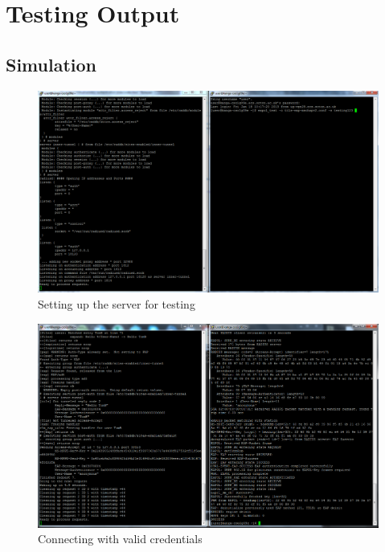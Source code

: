 \documentclass[12pt,a4paper,titlepage]{article}
\begin{document}
\section{Testing Output}

\subsection{Simulation}
\label{sec:testing-output;sub:simulation}
\begin{figure}[h!]
\centering
\includegraphics[scale=0.3]{./images/simulation/test1.png}
\caption{Setting up the server for testing}
\end{figure}

\begin{figure}[h!]
\centering
\includegraphics[scale=0.3]{./images/simulation/test2.png}
\caption{Connecting with valid credentials}
\end{figure}
\end{document}
